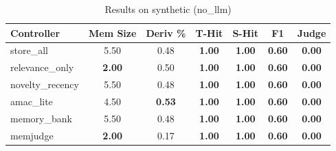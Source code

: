 \begin{table}[t]
\centering
\caption{Results on synthetic (no_llm)}
\label{tab:synthetic_no_llm}
\begin{tabular}{lcccccc}
\toprule
Controller & Mem Size & Deriv \% & T-Hit & S-Hit & F1 & Judge \\
\midrule
store\_all & 5.50 & 0.48 & \textbf{1.00} & \textbf{1.00} & \textbf{0.60} & \textbf{0.00} \\
relevance\_only & \textbf{2.00} & 0.50 & \textbf{1.00} & \textbf{1.00} & \textbf{0.60} & \textbf{0.00} \\
novelty\_recency & 5.50 & 0.48 & \textbf{1.00} & \textbf{1.00} & \textbf{0.60} & \textbf{0.00} \\
amac\_lite & 4.50 & \textbf{0.53} & \textbf{1.00} & \textbf{1.00} & \textbf{0.60} & \textbf{0.00} \\
memory\_bank & 5.50 & 0.48 & \textbf{1.00} & \textbf{1.00} & \textbf{0.60} & \textbf{0.00} \\
memjudge & \textbf{2.00} & 0.17 & \textbf{1.00} & \textbf{1.00} & \textbf{0.60} & \textbf{0.00} \\
\bottomrule
\end{tabular}
\end{table}